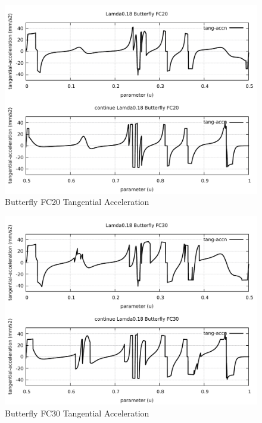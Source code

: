 \begin{figure}
	\caption     {Butterfly FC20 Tangential Acceleration}
	\label{22-img-Butterfly-FC20-Tangential-Acceleration.pdf}
	\includegraphics[width=1.00\textwidth]{Chap4/appendix/app-Butterfly/plots/22-img-Butterfly-FC20-Tangential-Acceleration.pdf}
\end{figure}

\clearpage
\pagebreak

\begin{figure}
	\caption     {Butterfly FC30 Tangential Acceleration}
	\label{23-img-Butterfly-FC30-Tangential-Acceleration.pdf}
	\includegraphics[width=1.00\textwidth]{Chap4/appendix/app-Butterfly/plots/23-img-Butterfly-FC30-Tangential-Acceleration.pdf}
\end{figure}


